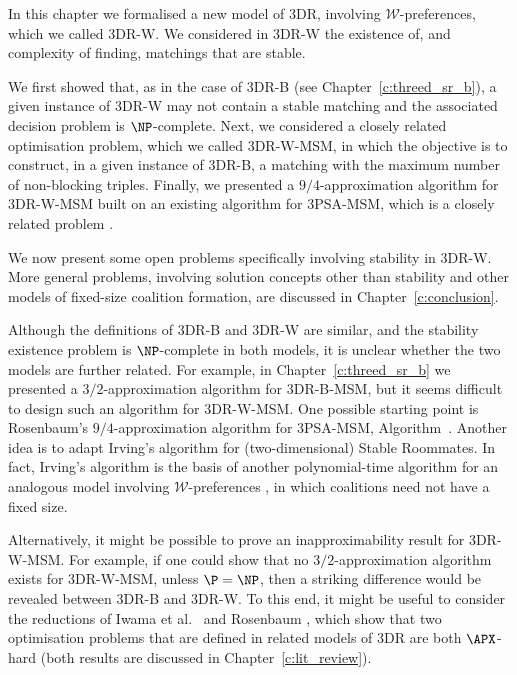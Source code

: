 In this chapter we formalised a new model of 3DR, involving $\mathscr{W}$-preferences, which we called 3DR-W. We considered in 3DR-W the existence of, and complexity of finding, matchings that are stable.

We first showed that, as in the case of 3DR-B (see Chapter~\ref{c:threed_sr_b}), a given instance of 3DR-W may not contain a stable matching and the associated decision problem is $\NP$-complete. Next, we considered a closely related optimisation problem, which we called 3DR-W-MSM, in which the objective is to construct, in a given instance of 3DR-B, a matching with the maximum number of non-blocking triples. Finally, we presented a $9/4$-approximation algorithm for 3DR-W-MSM built on an existing algorithm for 3PSA-MSM, which is a closely related problem \cite{rosenbaum16}. 

We now present some open problems specifically involving stability in 3DR-W. More general problems, involving solution concepts other than stability and other models of fixed-size coalition formation, are discussed in Chapter~\ref{c:conclusion}. 


Although the definitions of 3DR-B and 3DR-W are similar, and the stability existence problem is $\NP$-complete in both models, it is unclear whether the two models are further related. For example, in Chapter~\ref{c:threed_sr_b} we presented a $3/2$-approximation algorithm for 3DR-B-MSM, but it seems difficult to design such an algorithm for 3DR-W-MSM. One possible starting point is Rosenbaum's $9/4$-approximation algorithm for 3PSA-MSM, Algorithm~. Another idea is to adapt Irving's \cite{Irv85} algorithm for (two-dimensional) Stable Roommates. In fact, Irving's algorithm is the basis of another polynomial-time algorithm for an analogous model involving  $\mathscr{W}$-preferences \cite{CH04}, in which coalitions need not have a fixed size.

Alternatively, it might be possible to prove an inapproximability result for 3DR-W-MSM. For example, if one could show that no $3/2$-approximation algorithm exists for 3DR-W-MSM, unless $\P=\NP$, then a striking difference would be revealed between 3DR-B and 3DR-W. To this end, it might be useful to consider the reductions of Iwama et al.\ \cite{IMO08} and Rosenbaum \cite{rosenbaum16}, which show that two optimisation problems that are defined in related models of 3DR are both $\APX$-hard (both results are discussed in Chapter~\ref{c:lit_review}).



